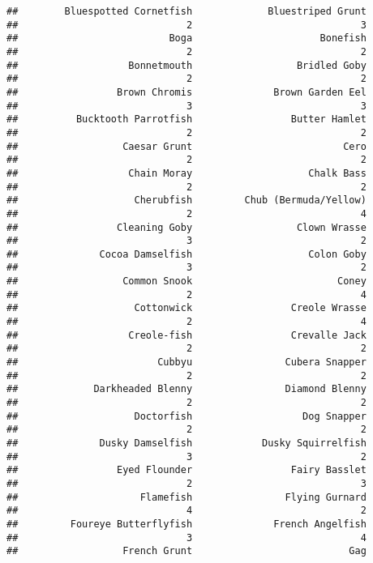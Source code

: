\documentclass[
]{article}
\begin{document}
\begin{verbatim}
##        Bluespotted Cornetfish             Bluestriped Grunt 
##                             2                             3 
##                          Boga                      Bonefish 
##                             2                             2 
##                   Bonnetmouth                  Bridled Goby 
##                             2                             2 
##                 Brown Chromis              Brown Garden Eel 
##                             3                             3 
##          Bucktooth Parrotfish                 Butter Hamlet 
##                             2                             2 
##                  Caesar Grunt                          Cero 
##                             2                             2 
##                   Chain Moray                    Chalk Bass 
##                             2                             2 
##                    Cherubfish         Chub (Bermuda/Yellow) 
##                             2                             4 
##                 Cleaning Goby                  Clown Wrasse 
##                             3                             2 
##              Cocoa Damselfish                    Colon Goby 
##                             3                             2 
##                  Common Snook                         Coney 
##                             2                             4 
##                    Cottonwick                 Creole Wrasse 
##                             2                             4 
##                   Creole-fish                 Crevalle Jack 
##                             2                             2 
##                        Cubbyu                Cubera Snapper 
##                             2                             2 
##             Darkheaded Blenny                Diamond Blenny 
##                             2                             2 
##                    Doctorfish                   Dog Snapper 
##                             2                             2 
##              Dusky Damselfish            Dusky Squirrelfish 
##                             3                             2 
##                 Eyed Flounder                 Fairy Basslet 
##                             2                             3 
##                     Flamefish                Flying Gurnard 
##                             4                             2 
##         Foureye Butterflyfish              French Angelfish 
##                             3                             4 
##                  French Grunt                           Gag 

\end{verbatim}
\end{document}
